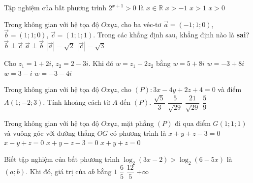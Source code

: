 \begin{ex}%
	Tập nghiệm của bất phương trình $2^{x+1}>0$ là
	\choice
	{\True $x \in \mathbb{R}$}
	{$x > -1$}
	{$x>1$}
	{$x>0$}
\end{ex}

\begin{ex}%
	Trong không gian với hệ tọa độ $Oxyz$, cho ba véc-tơ $\vec{a}=(-1;1;0)$, $\vec{b}=(1;1;0)$, $\vec{c}=(1;1;1)$. Trong các khẳng định sau, khẳng định nào là \textbf{sai}?
	\choice
	{\True $\vec{b} \perp \vec{c}$}
	{$\vec{a} \perp \vec{b}$}
	{$|\vec{a}|=\sqrt{2}$}
	{$|\vec{c}|=\sqrt{3}$}
\end{ex}

\begin{ex}%
	Cho $z_1=1+2i$, $z_2=2-3i$. Khi đó $w=z_1-2z_2$ bằng
	\choice
	{$w=5+8i$}
	{\True $w=-3+8i$}
	{$w=3-i$}
	{$w=-3-4i$}
\end{ex}

\begin{ex}%
	Trong không gian với hệ tọa độ $Oxyz$, cho $(P) \colon 3x-4y+2z+4=0$ và điểm $A(1;-2;3)$. Tính khoảng cách từ $A$ đến $(P)$.
	\choice
	{$\dfrac{\sqrt{5}}{3}$}
	{$\dfrac{5}{\sqrt{29}}$}
	{\True $\dfrac{21}{\sqrt{29}}$}
	{$\dfrac{5}{9}$}
\end{ex}

\begin{ex}%
	Trong không gian với hệ tọa độ $Oxyz$, mặt phẳng $(P)$ đi qua điểm $G(1;1;1)$ và vuông góc với đường thẳng $OG$ có phương trình là
	\choice
	{\True $x+y+z-3=0$}
	{$x-y+z=0$}
	{$x+y-z-3=0$}
	{$x+y+z=0$}
\end{ex}

\begin{ex}%
	Biết tập nghiệm của bất phương trình $\log_2(3x-2) > \log_2(6-5x)$ là $(a;b)$. Khi đó, giá trị của $ab$ bằng
	\choice
	{$1$}
	{\True $\dfrac{6}{5}$}
	{$\dfrac{12}{5}$}
	{$+\infty$}
\end{ex}

